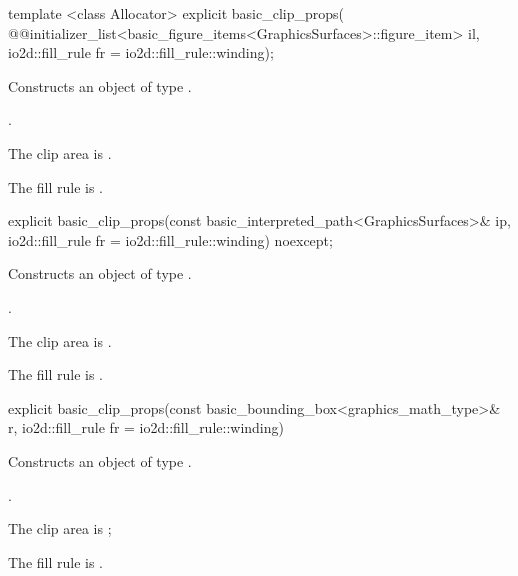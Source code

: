 %
\begin{itemdecl}
template <class Allocator>
explicit basic_clip_props(
  @\stdqualifier{}@initializer_list<basic_figure_items<GraphicsSurfaces>::figure_item> il,
  io2d::fill_rule fr = io2d::fill_rule::winding);
\end{itemdecl}
\begin{itemdescr}
\pnum
\effects
Constructs an object of type .

\pnum
\postconditions
{}.

\remarks
\pnum
The clip area is .

\pnum
The fill rule is .
\end{itemdescr}

%
\begin{itemdecl}
explicit basic_clip_props(const basic_interpreted_path<GraphicsSurfaces>& ip,
  io2d::fill_rule fr = io2d::fill_rule::winding) noexcept;
\end{itemdecl}
\begin{itemdescr}
\pnum
\effects
Constructs an object of type .

\pnum
\postconditions
{}.

\remarks
\pnum
The clip area is .

\pnum
The fill rule is .
\end{itemdescr}

%
\begin{itemdecl}
explicit basic_clip_props(const basic_bounding_box<graphics_math_type>& r,
  io2d::fill_rule fr = io2d::fill_rule::winding)
\end{itemdecl}
\begin{itemdescr}
\pnum
\effects
Constructs an object of type .

\pnum
\postconditions
{}.

\remarks
\pnum
The clip area is ;

\pnum
The fill rule is .
\end{itemdescr}

